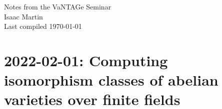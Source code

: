 


\pagestyle{empty}
	\LARGE
\begin{center}
	Notes from the VaNTAGe Seminar \\
	\Large
	Isaac Martin \\
    Last compiled \today
\end{center}
\normalsize
\vspace{-2mm}
\hru

\tableofcontents
\newpage

\section{2022-02-01: Computing isomorphism classes of abelian varieties over finite fields}

